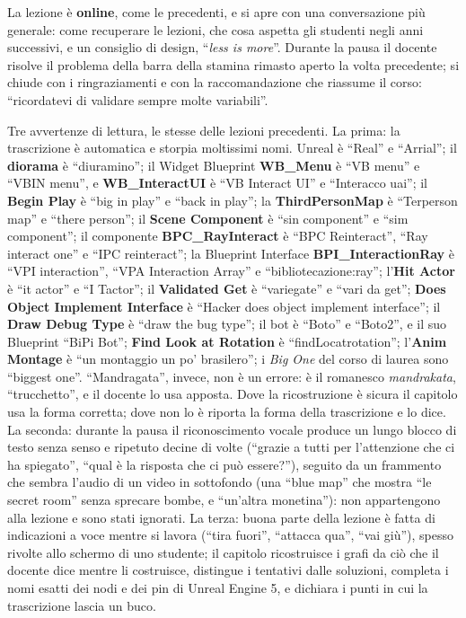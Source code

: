 La lezione è \textbf{online}, come le precedenti, e si apre con una conversazione più
generale: come recuperare le lezioni, che cosa aspetta gli studenti negli anni successivi,
e un consiglio di design, ``\emph{less is more}''. Durante la pausa il docente risolve il
problema della barra della stamina rimasto aperto la volta precedente; si chiude con i
ringraziamenti e con la raccomandazione che riassume il corso: ``ricordatevi di validare
sempre molte variabili''.

Tre avvertenze di lettura, le stesse delle lezioni precedenti. La prima: la trascrizione
è automatica e storpia moltissimi nomi. Unreal è ``Real'' e ``Arrial''; il
\textbf{diorama} è ``diuramino''; il Widget Blueprint \textbf{WB\_Menu} è ``VB menu'' e
``VBIN menu'', e \textbf{WB\_InteractUI} è ``VB Interact UI'' e ``Interacco uai''; il
\textbf{Begin Play} è ``big in play'' e ``back in play''; la \textbf{ThirdPersonMap} è
``Terperson map'' e ``there person''; il \textbf{Scene Component} è ``sin component'' e
``sim component''; il componente \textbf{BPC\_RayInteract} è ``BPC Reinteract'', ``Ray
interact one'' e ``IPC reinteract''; la Blueprint Interface \textbf{BPI\_InteractionRay} è
``VPI interaction'', ``VPA Interaction Array'' e ``bibliotecazione:ray''; l'\textbf{Hit
Actor} è ``it actor'' e ``I Tactor''; il \textbf{Validated Get} è ``variegate'' e ``vari da
get''; \textbf{Does Object Implement Interface} è ``Hacker does object implement
interface''; il \textbf{Draw Debug Type} è ``draw the bug type''; il bot è ``Boto'' e
``Boto2'', e il suo Blueprint ``BiPi Bot''; \textbf{Find Look at Rotation} è
``findLocatrotation''; l'\textbf{Anim Montage} è ``un montaggio un po' brasilero''; i
\emph{Big One} del corso di laurea sono ``biggest one''. ``Mandragata'', invece, non è un
errore: è il romanesco \emph{mandrakata}, ``trucchetto'', e il docente lo usa apposta.
Dove la ricostruzione è sicura il capitolo usa la forma corretta; dove non lo è riporta la
forma della trascrizione e lo dice. La seconda: durante la pausa il riconoscimento vocale
produce un lungo blocco di testo senza senso e ripetuto decine di volte (``grazie a tutti
per l'attenzione che ci ha spiegato'', ``qual è la risposta che ci può essere?''), seguito
da un frammento che sembra l'audio di un video in sottofondo (una ``blue map'' che mostra
``le secret room'' senza sprecare bombe, e ``un'altra monetina''): non appartengono alla
lezione e sono stati ignorati. La terza: buona parte della lezione è fatta di indicazioni
a voce mentre si lavora (``tira fuori'', ``attacca qua'', ``vai giù''), spesso rivolte
allo schermo di uno studente; il capitolo ricostruisce i grafi da ciò che il docente dice
mentre li costruisce, distingue i tentativi dalle soluzioni, completa i nomi esatti dei
nodi e dei pin di Unreal Engine 5, e dichiara i punti in cui la trascrizione lascia un
buco.

